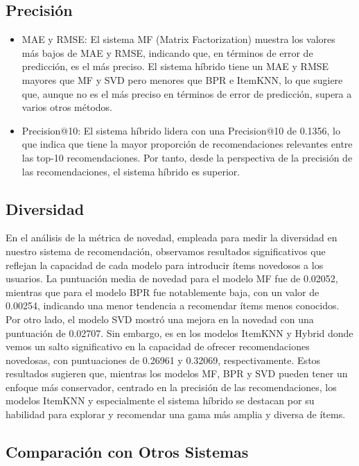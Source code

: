 \documentclass[a4paper,12pt]{report}
\begin{document}
    \subsection{Precisión}
    \begin{itemize}
    \item MAE y RMSE: El sistema MF (Matrix Factorization) muestra los valores más bajos de MAE y RMSE, indicando que, en términos de error de predicción, es el más preciso. El sistema híbrido tiene un MAE y RMSE mayores que MF y SVD pero menores que BPR e ItemKNN, lo que sugiere que, aunque no es el más preciso en términos de error de predicción, supera a varios otros métodos.
    
    \item Precision@10: El sistema híbrido lidera con una Precision@10 de 0.1356, lo que indica que tiene la mayor proporción de recomendaciones relevantes entre las top-10 recomendaciones. Por tanto, desde la perspectiva de la precisión de las recomendaciones, el sistema híbrido es superior.
    \end{itemize}
    

    \subsection{Diversidad}
    En el análisis de la métrica de novedad, empleada para medir la diversidad en nuestro sistema de recomendación, observamos resultados significativos que reflejan la capacidad de cada modelo para introducir ítems novedosos a los usuarios. La puntuación media de novedad para el modelo MF fue de 0.02052, mientras que para el modelo BPR fue notablemente baja, con un valor de 0.00254, indicando una menor tendencia a recomendar ítems menos conocidos. Por otro lado, el modelo SVD mostró una mejora en la novedad con una puntuación de 0.02707. Sin embargo, es en los modelos ItemKNN y Hybrid donde vemos un salto significativo en la capacidad de ofrecer recomendaciones novedosas, con puntuaciones de 0.26961 y 0.32069, respectivamente. Estos resultados sugieren que, mientras los modelos MF, BPR y SVD pueden tener un enfoque más conservador, centrado en la precisión de las recomendaciones, los modelos ItemKNN y especialmente el sistema híbrido se destacan por su habilidad para explorar y recomendar una gama más amplia y diversa de ítems.

    \subsection{Comparación con Otros Sistemas}
\end{document}
